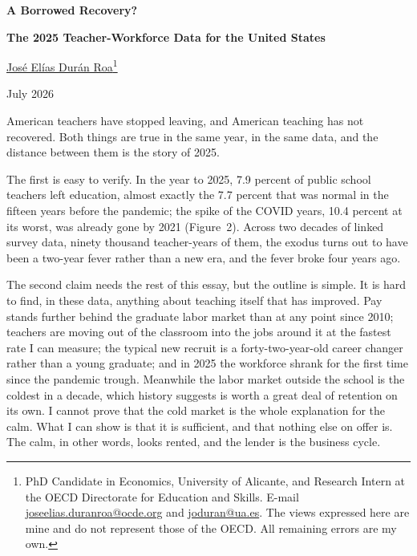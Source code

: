 \documentclass[11pt,a4paper]{article}
\begin{document}
\vspace*{22pt}
\begin{center}
{\fontsize{20}{26}\selectfont\bfseries
A Borrowed Recovery?\par}
\vspace{8pt}
{\fontsize{15}{20}\selectfont\bfseries
The 2025 Teacher-Workforce Data for the United States\par}

\vspace{22pt}
{\large \href{https://sites.google.com/view/joseeliasduranroa}{José Elías
Durán Roa}\footnote{PhD Candidate in Economics, University of Alicante, and
Research Intern at the OECD Directorate for Education and Skills. E-mail\,
\href{mailto:joseelias.duranroa@ocde.org}{joseelias.duranroa@ocde.org} and
\href{mailto:joduran@ua.es}{joduran@ua.es}. The views expressed here are
mine and do not represent those of the OECD. All remaining errors are my
own.}}

\vspace{6pt}
{\small July 2026}
\end{center}

\vspace{14pt}

American teachers have stopped leaving, and American teaching has not
recovered. Both things are true in the same year, in the same data, and
the distance between them is the story of 2025.

The first is easy to verify. In the year to 2025, 7.9 percent of public
school teachers left education, almost exactly the 7.7 percent that was
normal in the fifteen years before the pandemic; the spike of the COVID
years, 10.4 percent at its worst, was already gone by 2021 (Figure~2).
Across two decades of linked survey data, ninety thousand teacher-years
of them, the exodus turns out to have been a two-year fever rather than a
new era, and the fever broke four years ago.

The second claim needs the rest of this essay, but the outline is
simple. It is hard to find, in these data, anything about teaching itself
that has improved. Pay stands further behind the graduate labor market
than at any point since 2010; teachers are moving out of the classroom
into the jobs around it at the fastest rate I can measure; the typical
new recruit is a forty-two-year-old career changer rather than a young
graduate; and in 2025 the workforce shrank for the first time since the
pandemic trough. Meanwhile the labor market outside the school is the
coldest in a decade, which history suggests is worth a great deal of
retention on its own. I cannot prove that the cold market is the whole
explanation for the calm. What I can show is that it is sufficient, and
that nothing else on offer is. The calm, in other words, looks rented,
and the lender is the business cycle.
\end{document}
